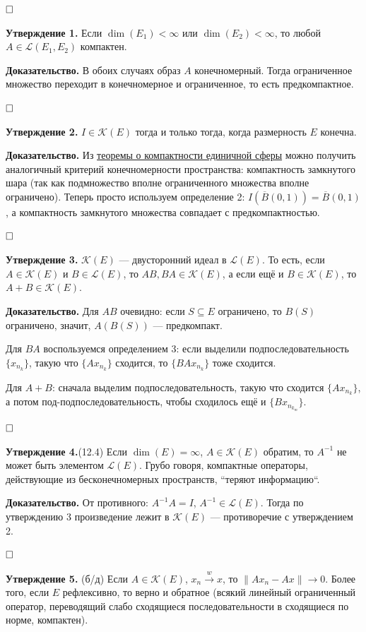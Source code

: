 \documentclass[12pt, a4paper]{article}
\newcommand{\QED}{$\hfill\square$}
\renewcommand{\subset}{\subseteq}   %
\begin{document}
\QED

\textbf{Утверждение 1.} Если $\dim(E_1) < \infty$ или $\dim(E_2) < \infty$, то любой $A \in \mathcal L(E_1, E_2)$ компактен.

\textbf{Доказательство.} В обоих случаях образ $A$ конечномерный. Тогда ограниченное множество переходит в конечномерное и ограниченное, то есть предкомпактное.

\QED

\textbf{Утверждение 2.} $I \in \mathcal K(E)$ тогда и только тогда, когда размерность $E$ конечна.

\textbf{Доказательство.} Из \hyperref[th:4-1]{теоремы о компактности единичной сферы} можно получить аналогичный критерий конечномерности пространства: компактность замкнутого шара (так как подмножество вполне ограниченного множества вполне ограничено). Теперь просто используем определение 2: $I(\overline B(0, 1)) = \overline B(0, 1)$, а компактность замкнутого множества совпадает с предкомпактностью.

\QED

\textbf{Утверждение 3.} $\mathcal K(E)$ --- двусторонний идеал в $\mathcal L(E)$. То есть, если $A \in \mathcal K(E)$ и $B \in \mathcal L(E)$, то $AB, BA \in \mathcal K(E)$, а если ещё и $B \in \mathcal K(E)$, то $A + B \in \mathcal K(E)$.

\textbf{Доказательство.} Для $AB$ очевидно: если $S \subset E$ ограничено, то $B(S)$ ограничено, значит, $A(B(S))$ --- предкомпакт.

Для $BA$ воспользуемся определением 3: если выделили подпоследовательность $\{x_{n_k}\}$, такую что $\{Ax_{n_k}\}$ сходится, то $\{BAx_{n_k}\}$ тоже сходится.

Для $A + B$: сначала выделим подпоследовательность, такую что сходится $\{Ax_{n_k}\}$, а потом под-подпоследовательность, чтобы сходилось ещё и $\{Bx_{n_{k_m}}\}$.

\QED

\textbf{Утверждение 4.}(12.4)  \label{st:12.4} Если $\dim(E) = \infty$, $A \in \mathcal K(E)$ обратим, то $A^{-1}$ не может быть элементом $\mathcal L(E)$.
Грубо говоря, компактные операторы, действующие из бесконечномерных пространств, ``теряют информацию``.

\textbf{Доказательство.} От противного: $A^{-1} A = I$, $A^{-1} \in \mathcal{L}(E)$.
Тогда по утверждению 3 произведение лежит в $\mathcal K(E)$ --- противоречие с утверждением 2.

\QED

\textbf{Утверждение 5.} (б/д) Если $A \in \mathcal K(E)$, $x_n \xrightarrow{w} x$, то $\|Ax_n - Ax\| \to 0$.
Более того, если $E$ рефлексивно, то верно и обратное (всякий линейный ограниченный оператор, переводящий слабо сходящиеся последовательности в сходящиеся по норме, компактен).
\end{document}
